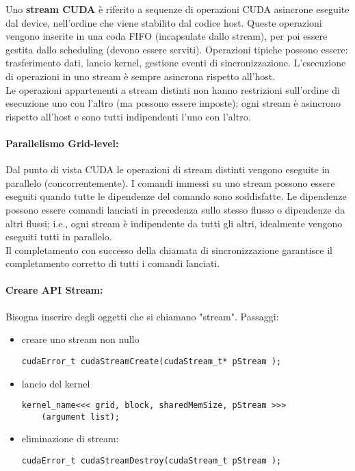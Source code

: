Uno \textbf{stream CUDA} è riferito a sequenze di operazioni CUDA asincrone eseguite dal device, nell'ordine che viene stabilito dal codice host. Queste operazioni vengono inserite in una coda FIFO (incapsulate dallo stream), per poi essere gestita dallo scheduling (devono essere serviti). Operazioni tipiche possono essere: trasferimento dati, lancio kernel, gestione eventi di sincronizzazione. L'esecuzione di operazioni in uno stream è sempre asincrona rispetto all'host.\\

Le operazioni appartenenti a stream distinti non hanno restrizioni sull'ordine di esecuzione uno con l'altro (ma possono essere imposte); ogni stream è asincrono rispetto all'host e sono tutti indipendenti l'uno con l'altro.\\

\paragraph{Parallelismo Grid-level:} Dal punto di vista CUDA le operazioni di stream distinti vengono eseguite in parallelo (concorrentemente). I comandi immessi su uno stream possono essere eseguiti quando tutte le dipendenze del comando sono soddisfatte. Le dipendenze possono essere comandi lanciati in precedenza sullo stesso flusso o dipendenze da altri flussi; i.e., ogni stream è indipendente da tutti gli altri, idealmente vengono eseguiti tutti in parallelo. \\

Il completamento con successo della chiamata di sincronizzazione garantisce il completamento corretto di tutti i comandi lanciati.\\

\paragraph{Creare API Stream:} Bisogna inserire degli oggetti che si chiamano "stream". Passaggi: 
\begin{itemize}
	\item creare uno stream non nullo
	\begin{verbatim}
cudaError_t cudaStreamCreate(cudaStream_t* pStream );
	\end{verbatim}
	\item lancio del kernel
	\begin{verbatim}
kernel_name<<< grid, block, sharedMemSize, pStream >>>
	(argument list);
	\end{verbatim}
	\item eliminazione di stream:
	\begin{verbatim}
cudaError_t cudaStreamDestroy(cudaStream_t pStream );
	\end{verbatim}
\end{itemize}

